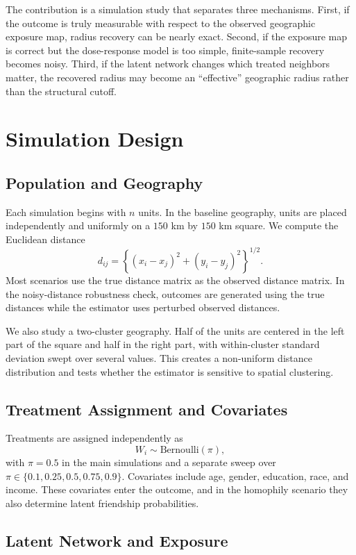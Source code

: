 \documentclass[11pt]{article}
\begin{document}
The contribution is a simulation study that separates three mechanisms. First, if the outcome is truly measurable with respect to the observed geographic exposure map, radius recovery can be nearly exact. Second, if the exposure map is correct but the dose-response model is too simple, finite-sample recovery becomes noisy. Third, if the latent network changes which treated neighbors matter, the recovered radius may become an ``effective'' geographic radius rather than the structural cutoff.

\section{Simulation Design}

\subsection{Population and Geography}

Each simulation begins with $n$ units. In the baseline geography, units are placed independently and uniformly on a $150$ km by $150$ km square. We compute the Euclidean distance
\[
d_{ij}=\left\{(x_i-x_j)^2+(y_i-y_j)^2\right\}^{1/2}.
\]
Most scenarios use the true distance matrix as the observed distance matrix. In the noisy-distance robustness check, outcomes are generated using the true distances while the estimator uses perturbed observed distances.

We also study a two-cluster geography. Half of the units are centered in the left part of the square and half in the right part, with within-cluster standard deviation swept over several values. This creates a non-uniform distance distribution and tests whether the estimator is sensitive to spatial clustering.

\subsection{Treatment Assignment and Covariates}

Treatments are assigned independently as
\[
W_i\sim \text{Bernoulli}(\pi),
\]
with $\pi=0.5$ in the main simulations and a separate sweep over $\pi\in\{0.1,0.25,0.5,0.75,0.9\}$. Covariates include age, gender, education, race, and income. These covariates enter the outcome, and in the homophily scenario they also determine latent friendship probabilities.

\subsection{Latent Network and Exposure}
\end{document}

